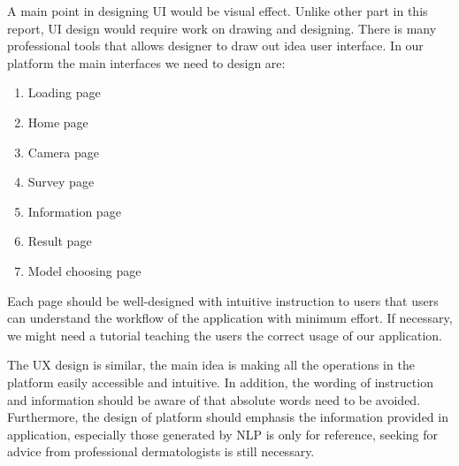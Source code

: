                 A main point in designing UI would be visual effect. Unlike other part in this report, UI design would require work on drawing and designing. There is many professional tools that allows designer to draw out idea user interface. In our platform the main interfaces we need to design are:
                \begin{enumerate}
                    \item Loading page
                    \item Home page
                    \item Camera page
                    \item Survey page
                    \item Information page
                    \item Result page
                    \item Model choosing page
                \end{enumerate}
                Each page should be well-designed with intuitive instruction to users that users can understand the workflow of the application with minimum effort. If necessary, we might need a tutorial teaching the users the correct usage of our application.

                The UX design is similar, the main idea is making all the operations in the platform easily accessible and intuitive. In addition, the wording of instruction and information should be aware of that absolute words need to be avoided. Furthermore, the design of platform should emphasis the information provided in application, especially those generated by NLP is only for reference, seeking for advice from professional dermatologists is still necessary.